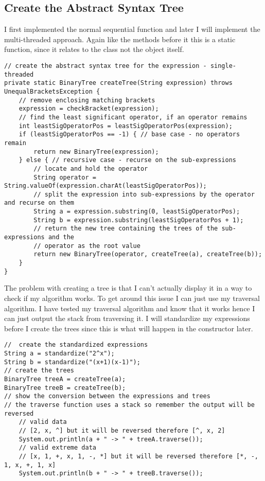 \documentclass[../../../../../main.tex]{subfiles}
\begin{document}
\subsection{Create the Abstract Syntax Tree}
I first implemented the normal sequential function and later I will implement the multi-threaded approach. Again like the methods before it this is a static function, since it relates to the class not the object itself.
\begin{verbatim}
// create the abstract syntax tree for the expression - single-threaded
private static BinaryTree createTree(String expression) throws UnequalBracketsException {
	// remove enclosing matching brackets
	expression = checkBracket(expression);
	// find the least significant operator, if an operator remains
	int leastSigOperatorPos = leastSigOperatorPos(expression);
	if (leastSigOperatorPos == -1) { // base case - no operators remain
		return new BinaryTree(expression);
	} else { // recursive case - recurse on the sub-expressions
		// locate and hold the operator
		String operator = String.valueOf(expression.charAt(leastSigOperatorPos));
		// split the expression into sub-expressions by the operator and recurse on them
		String a = expression.substring(0, leastSigOperatorPos);
		String b = expression.substring(leastSigOperatorPos + 1);
		// return the new tree containing the trees of the sub-expressions and the
		// operator as the root value
		return new BinaryTree(operator, createTree(a), createTree(b));
	}
}
\end{verbatim}
The problem with creating a tree is that I can't actually display it in a way to check if my algorithm works. To get around this issue I can just use my traversal algorithm. I have tested my traversal algorithm and know that it works hence I can just output the stack from traversing it. I will standardize my expressions before I create the trees since this is what will happen in the constructor later.
\begin{verbatim}
//  create the standardized expressions
String a = standardize("2^x");
String b = standardize("(x+1)(x-1)");
// create the trees
BinaryTree treeA = createTree(a);
BinaryTree treeB = createTree(b);
// show the conversion between the expressions and trees
// the traverse function uses a stack so remember the output will be reversed
	// valid data
	// [2, x, ^] but it will be reversed therefore [^, x, 2]
	System.out.println(a + " -> " + treeA.traverse());
	// valid extreme data
	// [x, 1, +, x, 1, -, *] but it will be reversed therefore [*, -, 1, x, +, 1, x]
	System.out.println(b + " -> " + treeB.traverse());
\end{verbatim}
\end{document}
